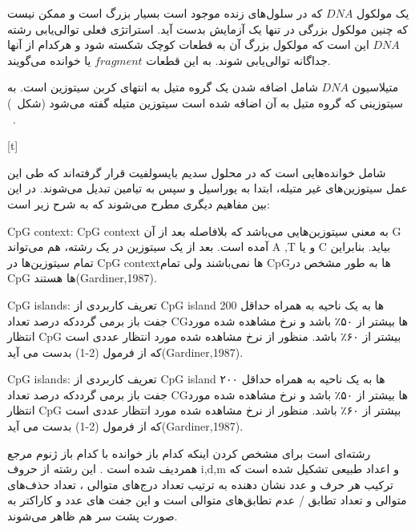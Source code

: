 
یک مولکول $DNA$ که در سلول‌های زنده موجود است بسیار بزرگ است و ممکن نیست که چنین مولکول بزرگی در تنها یک آزمایش بدست آید. استراتژی فعلی توالی‌یابی رشته $DNA$ این است که مولکول بزرگ آن به قطعات کوچک شکسته شود و هرکدام از آنها جداگانه توالی‌یابی شوند. به این قطعات $fragment$ یا خوانده می‌گویند.


متیلاسیون $DNA$ شامل اضافه شدن یک گروه متیل به انتهای کربن سیتوزین است. به سیتوزینی که گروه متیل به آن اضافه شده است سیتوزین متیله گفته می‌شود (شکل~)
~\cite{krueger2012dna}.

[t]



شامل خوانده‌هایی است که در محلول سدیم بایسولفیت قرار گرفته‌اند که طی این عمل سیتوزین‌های غیر متیله، ابتدا به یوراسیل و سپس به تیامین تبدیل می‌شوند. در این بین مفاهیم دیگری مطرح می‌شوند که به شرح زیر است:


 CpG context:
CpG context به معنی سیتوزین‌هایی می‌باشد که بلافاصله بعد از آن  G آمده است. بعد از یک سیتوزین در یک رشته، هم می‌تواند A ,T و یا C بیاید. بنابراین تمام سیتوزین‌ها در CpG contextها نمی‌باشند ولی تمام CpGها به طور مشخص در CpG ها هستند(Gardiner,1987).

 CpG islands:
تعریف کاربردی از CpG island ها به یک ناحیه به همراه حداقل 200 جفت باز برمی گرددکه درصد تعداد CGها بیشتر از ۵۰٪ باشد و نرخ مشاهده شده مورد انتظار CpG بیشتر از ۶۰٪ باشد. منظور از نرخ مشاهده شده مورد انتظار عددی است که از فرمول (2-1) بدست می آید(Gardiner,1987).



CpG islands:
تعریف کاربردی از CpG island ها به یک ناحیه به همراه حداقل ۲۰۰ جفت باز برمی گرددکه درصد تعداد CGها بیشتر از ۵۰٪ باشد و نرخ مشاهده شده مورد انتظار CpG بیشتر از ۶۰٪ باشد. منظور از نرخ مشاهده شده مورد انتظار عددی است که از فرمول (2-1) بدست می آید(Gardiner,1987).


رشته‌ای است برای مشخص کردن اینکه کدام باز خوانده با کدام باز ژنوم مرجع همردیف شده است . این رشته از حروف i,d,m و اعداد طبیعی تشکیل شده است که ترکیب هر حرف و عدد نشان دهنده به ترتیب تعداد درج‌های متوالی ، تعداد حذف‌های متوالی و تعداد تطابق / عدم تطابق‌های متوالی است و این جفت های عدد و کاراکتر به صورت پشت سر هم ظاهر می‌شوند.

